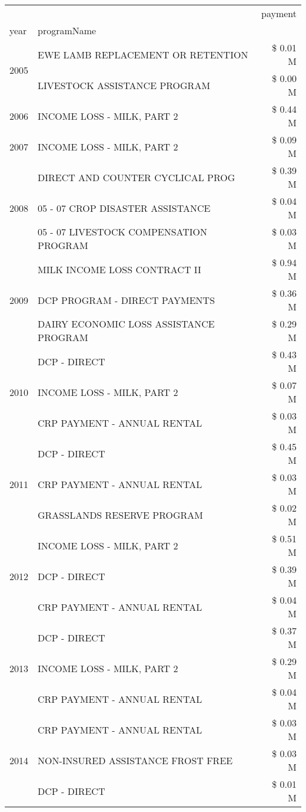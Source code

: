 \begin{tabular}{llr}
\toprule
 &  & payment \\
year & programName &  \\
\midrule
\multirow[t]{2}{*}{2005} & EWE LAMB REPLACEMENT OR RETENTION & \$ 0.01 M \\
 & LIVESTOCK ASSISTANCE PROGRAM & \$ 0.00 M \\
\cline{1-3}
2006 & INCOME LOSS - MILK, PART 2 & \$ 0.44 M \\
\cline{1-3}
2007 & INCOME LOSS - MILK, PART 2 & \$ 0.09 M \\
\cline{1-3}
\multirow[t]{3}{*}{2008} & DIRECT AND COUNTER CYCLICAL PROG & \$ 0.39 M \\
 & 05 - 07 CROP DISASTER ASSISTANCE & \$ 0.04 M \\
 & 05 - 07 LIVESTOCK COMPENSATION PROGRAM & \$ 0.03 M \\
\cline{1-3}
\multirow[t]{3}{*}{2009} & MILK INCOME LOSS CONTRACT II & \$ 0.94 M \\
 & DCP PROGRAM - DIRECT PAYMENTS & \$ 0.36 M \\
 & DAIRY ECONOMIC LOSS ASSISTANCE PROGRAM & \$ 0.29 M \\
\cline{1-3}
\multirow[t]{3}{*}{2010} & DCP - DIRECT & \$ 0.43 M \\
 & INCOME LOSS - MILK, PART 2 & \$ 0.07 M \\
 & CRP PAYMENT - ANNUAL RENTAL & \$ 0.03 M \\
\cline{1-3}
\multirow[t]{3}{*}{2011} & DCP - DIRECT & \$ 0.45 M \\
 & CRP PAYMENT - ANNUAL RENTAL & \$ 0.03 M \\
 & GRASSLANDS RESERVE PROGRAM & \$ 0.02 M \\
\cline{1-3}
\multirow[t]{3}{*}{2012} & INCOME LOSS - MILK, PART 2 & \$ 0.51 M \\
 & DCP - DIRECT & \$ 0.39 M \\
 & CRP PAYMENT - ANNUAL RENTAL & \$ 0.04 M \\
\cline{1-3}
\multirow[t]{3}{*}{2013} & DCP - DIRECT & \$ 0.37 M \\
 & INCOME LOSS - MILK, PART 2 & \$ 0.29 M \\
 & CRP PAYMENT - ANNUAL RENTAL & \$ 0.04 M \\
\cline{1-3}
\multirow[t]{3}{*}{2014} & CRP PAYMENT - ANNUAL RENTAL & \$ 0.03 M \\
 & NON-INSURED ASSISTANCE FROST FREE & \$ 0.03 M \\
 & DCP - DIRECT & \$ 0.01 M \\

\end{tabular}
